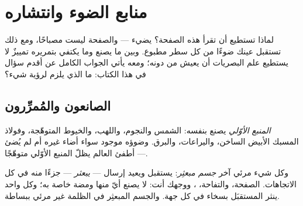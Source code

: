 \chapter{منابع الضوء وانتشاره}\label{ch:g7:light-sources-propagation}

لماذا تستطيع أن تقرأ هذه الصفحة؟  يضيء --- والصفحة ليست
مصباحًا، ومع ذلك تستقبل عينك ضوءًا من كل سطر مطبوع. وبين ما
يصنع  وما يكتفي بتمريره تمييزٌ لا يستطيع علم البصريات أن
يعيش من دونه؛ ومعه يأتي الجواب الكامل عن أقدم سؤال في هذا
الكتاب: ما الذي يلزم لرؤية شيء؟

\section{الصانعون والمُمرِّرون}

\begin{definition}\label{def:g7:light-sources-propagation:primary}
\emph{المنبع الأوّلي} يصنع  بنفسه: الشمس
والنجوم، واللهب، والخيوط المتوهّجة، وفولاذ المسبك الأبيض
الساخن، واليراعات، والبرق. وضوؤه موجود سواء أضاء غيره أم لم
يُضئ --- أطفئ العالم يظلّ المنبع الأوّلي متوهّجًا.
\end{definition}

\begin{definition}\label{def:g7:light-sources-propagation:diffusion}
وكل شيء مرئي آخر \emph{جسم مبعثِر}: يستقبل 
ويعيد إرسال --- \emph{يبعثر} --- جزءًا منه في كل الاتجاهات.
الصفحة، والتفاحة، ، ووجهك أنت: لا يصنع أيّ منها ومضة
خاصة به؛ وكل واحد ينثر  المستقبَل بسخاء في كل جهة. والجسم
المبعثِر في الظلمة غير مرئي ببساطة.
\end{definition}

